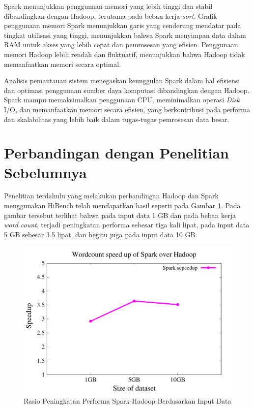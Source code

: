 Spark menunjukkan penggunaan memori yang lebih tinggi dan stabil dibandingkan dengan Hadoop, terutama pada beban kerja \textit{sort}. Grafik penggunaan memori Spark menunjukkan garis yang cenderung mendatar pada tingkat utilisasi yang tinggi, menunjukkan bahwa Spark menyimpan data dalam RAM untuk akses yang lebih cepat dan pemrosesan yang efisien. Penggunaan memori Hadoop lebih rendah dan fluktuatif, menunjukkan bahwa Hadoop tidak memanfaatkan memori secara optimal. 

Analisis pemantauan sistem menegaskan keunggulan Spark dalam hal efisiensi dan optimasi penggunaan sumber daya komputasi dibandingkan dengan Hadoop. Spark mampu memaksimalkan penggunaan CPU, meminimalkan operasi \textit{Disk} I/O, dan memanfaatkan memori secara efisien, yang berkontribusi pada performa dan skalabilitas yang lebih baik dalam tugas-tugas pemrosesan data besar.

\section{Perbandingan dengan Penelitian Sebelumnya}
Penelitian terdahulu yang melakukan perbandingan Hadoop dan Spark menggunakan HiBench telah mendapatkan hasil seperti pada Gambar \ref{fig:0-penelitian-lama}. Pada gambar tersebut terlihat bahwa pada input data 1 GB dan pada beban kerja \textit{word count}, terjadi peningkatan performa sebesar tiga kali lipat, pada input data 5 GB sebesar 3.5 lipat, dan begitu juga pada input data 10 GB.

\begin{figure}[h]
    \centering
    \includegraphics[width=1\textwidth]{figures/ch04/0-penelitian lama}
    \caption{Rasio Peningkatan Performa Spark-Hadoop Berdasarkan Input Data \cite{samadiPerformanceComparisonHadoop2018}}
    \label{fig:0-penelitian-lama}
\end{figure}


